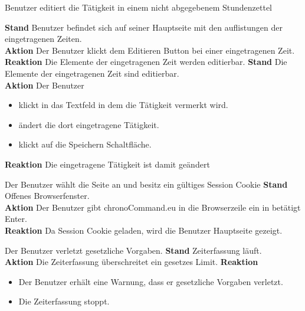 \begin{requirements}
	 Benutzer editiert die Tätigkeit in einem nicht abgegebenem Stundenzettel
	\begin{requirements}
	        \textbf{Stand} Benutzer befindet sich auf seiner Hauptseite mit den auflistungen der eingetragenen Zeiten. \\
	        \textbf{Aktion} Der Benutzer klickt dem Editieren Button bei einer eingetragenen Zeit.\\
            \textbf{Reaktion} Die Elemente der eingetragenen Zeit werden editierbar.
        \textbf{Stand} Die Elemente der eingetragenen Zeit sind editierbar.\\
        \textbf{Aktion} Der Benutzer
            \begin{itemize}
                \item klickt in das Textfeld in dem die Tätigkeit vermerkt wird.
                \item ändert die dort eingetragene Tätigkeit.
                \item klickt auf die Speichern Schaltfläche.
            \end{itemize}
            \textbf{Reaktion} Die eingetragene Tätigkeit ist damit geändert
    \end{requirements}

     Der Benutzer wählt die Seite an und besitz ein gültiges Session Cookie
        \textbf{Stand} Offenes Browserfenster. \\
        \textbf{Aktion} Der Benutzer gibt chronoCommand.eu in die Browserzeile ein in betätigt Enter. \\
        \textbf{Reaktion} Da Session Cookie geladen, wird die Benutzer Hauptseite gezeigt.

     Der Benutzer verletzt gesetzliche Vorgaben.
        \textbf{Stand} Zeiterfassung läuft. \\
        \textbf{Aktion} Die Zeiterfassung überschreitet ein gesetzes Limit.
        \textbf{Reaktion}
            \begin{itemize}
                \item Der Benutzer erhält eine Warnung, dass er gesetzliche Vorgaben verletzt.
                \item Die Zeiterfassung stoppt.
            \end{itemize}
\end{requirements}
